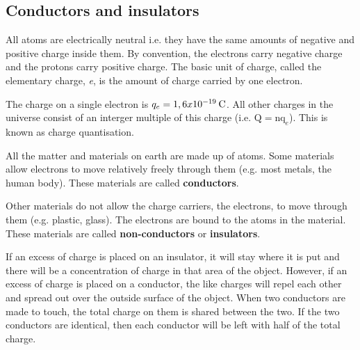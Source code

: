             \subsection{ Conductors and insulators}
            \nopagebreak
            \label{m38781*id201248}All atoms are electrically neutral i.e. they have the same amounts of negative and positive
charge inside them. By convention, the electrons carry negative charge and the protons carry
positive charge.
The basic unit of charge, called the elementary charge, \textsl{e}, is
the amount of charge carried by one electron.\par 
      \label{m38781*eip-517}The charge on a single electron is ${q}_{e}=1,6x{10}^{-19}\phantom{\rule{2pt}{0ex}}\mathrm{C}$. All other charges in the universe consist of an interger multiple of this charge (i.e. $\mathrm{Q}={\mathrm{nq}}_{e}$). This is known as charge quantisation.
\par \label{m38781*id201259}All the matter and materials on earth are made up of atoms.
Some materials allow electrons to move relatively freely
through them (e.g. most metals, the human body).
These materials are called \textbf{conductors}.\par 
      \label{m38781*id201271}Other materials do not allow the charge carriers, the electrons, to move
through them (e.g. plastic, glass).
The electrons are bound to the atoms in the material. These materials are called
\textbf{non-conductors} or \textbf{insulators}.\par 
      \label{m38781*id201289}If an excess of charge is placed on an insulator, it will stay
where it is put and there will be a concentration of charge in
that area of the object. However, if an excess of charge is placed
on a conductor, the like charges will repel each other
and spread out over the outside surface of the object. When two conductors
are made to touch, the total charge on them is shared between the
two. If the two conductors are identical, then each conductor will
be left with half of the total charge.\par 
\label{m38781*eip-536}
